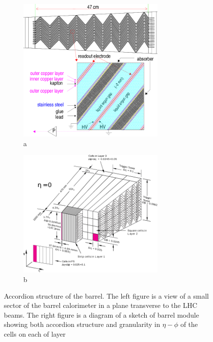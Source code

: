 \begin{figure}[htbp!]
\begin{subfigure}{.5\textwidth}
    \centering
    \includegraphics[width=0.8\textwidth]{chapters/c4/figures/lar-layers}
    \caption{a}
    \label{fig:lar1}
\end{subfigure}%
\begin{subfigure}{.5\textwidth}
    \centering
    \includegraphics[width=0.8\textwidth]{chapters/c4/figures/lar}
    \caption{b}
    \label{fig:lar2}
\end{subfigure}
\caption{Accordion structure of the barrel. The left figure is a view of a small sector of the barrel calorimeter in a plane transverse to the LHC beams. The right figure is a diagram of a sketch of barrel module showing both accordion structure and granularity in $\eta - \phi$ of the cells on each of layer}
\label{fig:pixel}
\end{figure}

